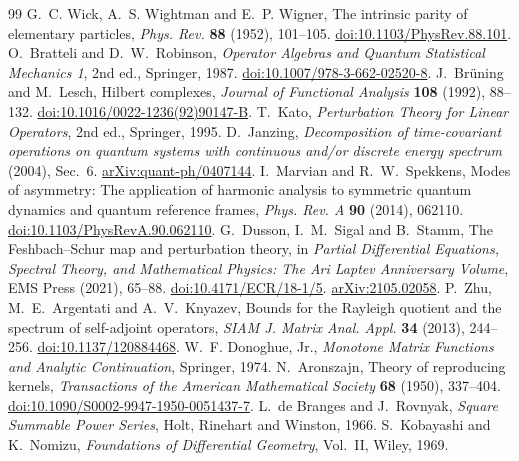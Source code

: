 \documentclass[11pt]{article}
\theoremstyle{definition}
\begin{document}
\begin{thebibliography}{99}
 G.~C. Wick, A.~S. Wightman and E.~P. Wigner, The intrinsic parity of elementary particles, \emph{Phys. Rev.} \textbf{88} (1952), 101--105. \href{https://doi.org/10.1103/PhysRev.88.101}{doi:10.1103/PhysRev.88.101}.
 O.~Bratteli and D.~W.~Robinson, \emph{Operator Algebras and Quantum Statistical Mechanics 1}, 2nd ed., Springer, 1987. \href{https://doi.org/10.1007/978-3-662-02520-8}{doi:10.1007/978-3-662-02520-8}.
 J.~Br\"uning and M.~Lesch, Hilbert complexes, \emph{Journal of Functional Analysis} \textbf{108} (1992), 88--132. \href{https://doi.org/10.1016/0022-1236(92)90147-B}{doi:10.1016/0022-1236(92)90147-B}.
 T.~Kato, \emph{Perturbation Theory for Linear Operators}, 2nd ed., Springer, 1995.
 D.~Janzing, \emph{Decomposition of time-covariant operations on quantum systems with continuous and/or discrete energy spectrum} (2004), Sec.~6. \href{https://arxiv.org/abs/quant-ph/0407144}{arXiv:quant-ph/0407144}.
 I.~Marvian and R.~W.~Spekkens, Modes of asymmetry: The application of harmonic analysis to symmetric quantum dynamics and quantum reference frames, \emph{Phys. Rev. A} \textbf{90} (2014), 062110. \href{https://doi.org/10.1103/PhysRevA.90.062110}{doi:10.1103/PhysRevA.90.062110}.
 G.~Dusson, I.~M.~Sigal and B.~Stamm, The Feshbach--Schur map and perturbation theory, in \emph{Partial Differential Equations, Spectral Theory, and Mathematical Physics: The Ari Laptev Anniversary Volume}, EMS Press (2021), 65--88. \href{https://doi.org/10.4171/ECR/18-1/5}{doi:10.4171/ECR/18-1/5}. \href{https://arxiv.org/abs/2105.02058}{arXiv:2105.02058}.
 P.~Zhu, M.~E.~Argentati and A.~V.~Knyazev, Bounds for the Rayleigh quotient and the spectrum of self-adjoint operators, \emph{SIAM J. Matrix Anal. Appl.} \textbf{34} (2013), 244--256. \href{https://doi.org/10.1137/120884468}{doi:10.1137/120884468}.
 W.~F. Donoghue, Jr., \emph{Monotone Matrix Functions and Analytic Continuation}, Springer, 1974.
 N.~Aronszajn, Theory of reproducing kernels, \emph{Transactions of the American Mathematical Society} \textbf{68} (1950), 337--404. \href{https://doi.org/10.1090/S0002-9947-1950-0051437-7}{doi:10.1090/S0002-9947-1950-0051437-7}.
 L.~de Branges and J.~Rovnyak, \emph{Square Summable Power Series}, Holt, Rinehart and Winston, 1966.
 S.~Kobayashi and K.~Nomizu, \emph{Foundations of Differential Geometry}, Vol.~II, Wiley, 1969.

\end{thebibliography}
\end{document}
